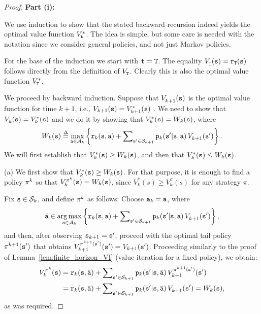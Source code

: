 \begin{proof}
\textbf{Part (i):}

We use induction to show that the stated backward recursion indeed
yields the optimal value function $V_{\tt t}^*$. The idea is simple,
but some care is needed with the notation 
since we consider general
policies, and not just Markov policies.


For the base of the induction we start with ${\tt t}={\tt T}$. The
equality $V_{\tt T}^{}({\tt s}) = {{\tt r}_{\tt T}}({\tt s})$
follows directly from the definition of $V_{\tt T}^{}$. Clearly
this is also the optimal value function $V^*_{{\tt T}}$.

We proceed by backward induction. Suppose that $V_{k +
1}^{}({\tt s})$ is the optimal value function for time $k + 1$, i.e.,
$V_{k + 1}({\tt s})=V^*_{k+1}({\tt s})$ . We need to show that
$V_k^{}({\tt s}) = V^*_k({\tt s})$ and we do it by showing that
$V^*_k({\tt s})={W_k}({\tt s})$, where
 \[{W_k}(\state) \buildrel \Delta \over = {\max _{\action \in {\Actions_k}}}\left\{ {{\reward_k}(\state,\action) + \sum\nolimits_{\state' \in {\States_{k + 1}}} {{\transitionprob_k}(\state'|\state,\action)\,} V_{k + 1}^{}(\state')} \right\}.\]
We will first establish that $V_k^{*}({\tt s}) \ge {W_k}({\tt s})$,
and then that $V_k^{*}({\tt s}) \le {W_k}({\tt s})$.

(a) We first show that $V_k^{*}({\tt s}) \ge {W_k}({\tt s})$. For that
purpose, it is enough to find a policy ${\pi ^k}$ so that
$V_k^{{\pi ^k}}({\tt s}) = {W_k}({\tt s})$, since $V^*_k(s)\geq
V^\pi_k(s)$ for any strategy $\pi$.

Fix ${\tt s} \in {\mathcal{S}_k}$, and define ${\pi ^k}$ as follows:
Choose ${{\tt a}_k} = \bar {{\tt a}}$, where
\[\bar{{\tt a}} \in \mathop {\arg \max }\limits_{{\tt a} \in {\mathcal{A}_k}} \left\{ {{{\tt r}_k}({\tt s},{\tt a}) + \sum\nolimits_{{\tt s}' \in {\mathcal{S}_{k + 1}}} {{{\tt p}_k}({\tt s}'|{\tt s},{\tt a})} \,V_{k + 1}^{}({\tt s}')} \right\},\]
and then, after observing  ${{\tt s}_{k + 1}} = {\tt s}'$, proceed
with the optimal tail policy ${\pi ^{k + 1}}({\tt s}')$ that
obtains $V_{k + 1}^{{\pi ^{k + 1}}({\tt s}')}({\tt s}') = {V_{k +
1}}({\tt s}')$. Proceeding similarly to
the proof of Lemma~\ref{lem:finite_horizon_VI} (value iteration for
a fixed policy), we obtain:
\begin{align}
V_k^{{\pi ^k}}({\tt s}) &= {{\tt r}_k}({\tt s},\bar {{\tt a}}) + \sum\nolimits_{{\tt s}' \in {\mathcal{S}_{k + 1}}} {{\tt p}_k({\tt s}'|{\tt s},\bar {{\tt a}})\,} V_{k + 1}^{{\pi ^{k + 1}}({\tt s}')}({\tt s}')\\
 &= {{\tt r}_k}({\tt s},\bar {{\tt a}}) + \sum\nolimits_{{\tt s}' \in {\mathcal{S}_{k + 1}}} {{\tt p}_k({\tt s}'|{\tt s},\bar {{\tt a}})} \,V_{k + 1}^{}({\tt s}') = {W_k}({\tt s}),
\end{align}
as was required.


\end{proof}
